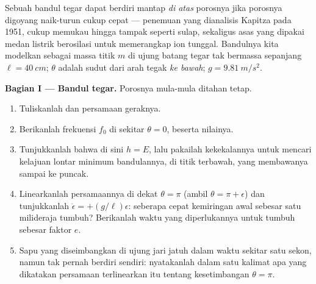 \begin{problem}\label{pb:b3:lagrangian-mechanics:1}
Sebuah bandul tegar dapat berdiri mantap \emph{di atas} porosnya jika
porosnya digoyang naik-turun cukup cepat --- penemuan yang dianalisis
Kapitza pada 1951, cukup memukau hingga tampak seperti sulap, sekaligus
asas yang dipakai medan listrik berosilasi untuk memerangkap ion tunggal.
Bandulnya kita modelkan sebagai massa titik $m$ di ujung batang tegar
tak bermassa sepanjang $\ell = \qty{40}{cm}$; $\theta$ adalah sudut dari
arah tegak \emph{ke bawah}; $g = \qty{9.81}{m/s^2}$.

\medskip\noindent\textbf{Bagian I --- Bandul tegar.}
Porosnya mula-mula ditahan tetap.
\begin{enumerate}
  \item Tuliskanlah  dan persamaan geraknya.
  \item Berikanlah frekuensi $f_0$  di sekitar $\theta =
        0$, beserta nilainya.
  \item Tunjukkanlah bahwa di sini $h = E$, lalu pakailah kekekalannya
        untuk mencari kelajuan lontar minimum bandulannya, di titik
        terbawah, yang membawanya sampai ke puncak.
  \item Linearkanlah persamaannya di dekat $\theta = \pi$ (ambil $\theta = \pi +
        \epsilon$) dan tunjukkanlah $\ddot\epsilon = +(g/\ell)\epsilon$:
        seberapa cepat kemiringan awal sebesar satu milideraja tumbuh?
        Berikanlah waktu yang diperlukannya untuk tumbuh sebesar faktor
        $e$.
  \item Sapu yang diseimbangkan di ujung jari jatuh dalam waktu sekitar
        satu sekon, namun tak pernah berdiri sendiri: nyatakanlah dalam
        satu kalimat apa yang dikatakan persamaan terlinearkan itu
        tentang kesetimbangan $\theta = \pi$.
\end{enumerate}


\end{problem}
